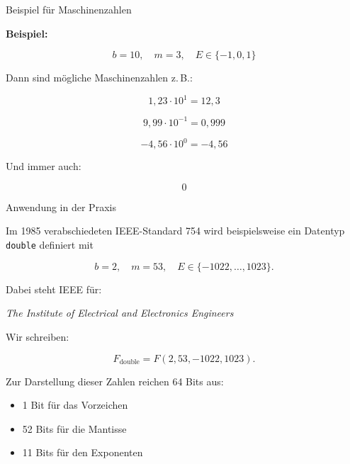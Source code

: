 \documentclass{beamer}
\begin{document}
\begin{frame}{Beispiel für Maschinenzahlen}

\large

\textbf{Beispiel:}

\[
b=10,\quad m=3,\quad E\in\{-1,0,1\}
\]

\vspace{0.5cm}

Dann sind mögliche Maschinenzahlen z.\,B.:

\[
1{,}23\cdot 10^1 = 12{,}3
\]

\[
9{,}99\cdot 10^{-1} = 0{,}999
\]

\[
-4{,}56\cdot 10^0 = -4{,}56
\]

\vspace{0.5cm}

Und immer auch:

\[
0
\]

\end{frame}
\begin{frame}{Anwendung in der Praxis}

\small

Im 1985 verabschiedeten IEEE-Standard 754 wird beispielsweise
ein Datentyp \texttt{double} definiert mit

\[
b=2,\quad m=53,\quad E\in\{-1022,\dots,1023\}.
\]

\vspace{0.4cm}

Dabei steht IEEE für:

\textit{The Institute of Electrical and Electronics Engineers}

\vspace{0.5cm}

Wir schreiben:

\[
F_{\text{double}}=F(2,53,-1022,1023).
\]

\vspace{0.5cm}

Zur Darstellung dieser Zahlen reichen 64 Bits aus:

\begin{itemize}
\item 1 Bit für das Vorzeichen
\item 52 Bits für die Mantisse
\item 11 Bits für den Exponenten
\end{itemize}

\end{frame}
\end{document}
